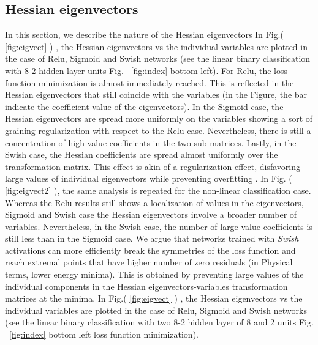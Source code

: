 \documentclass{article}
\begin{document}
\subsection{Hessian eigenvectors} \label{a:eigenvect}
%
In this section, we describe the nature of the Hessian eigenvectors
In Fig.( \ref{fig:eigvect} ) , the Hessian eigenvectors vs the individual variables are plotted in the case of Relu, Sigmoid and Swish networks (see the linear binary classification with 8-2 hidden layer units Fig. ~\eqref{fig:index} bottom left). For Relu, the loss function minimization is almost immediately reached. This is reflected in the Hessian eigenvectors that still coincide with the variables (in the Figure, the bar indicate the coefficient value of the eigenvectors). In the Sigmoid case, the Hessian eigenvectors are spread more uniformly on the variables showing a sort of graining regularization with respect to the Relu case. Nevertheless, there is still a concentration of high value coefficients in the two sub-matrices. Lastly, in the Swish case, the Hessian coefficients are spread almost uniformly over the transformation matrix. This effect is akin of a regularization effect, disfavoring large values of individual eigenvectors while preventing overfitting .
In Fig. ( \ref{fig:eigvect2} ), the same analysis is repeated for the non-linear classification case. Whereas the Relu results still shows a localization of values in the eigenvectors, Sigmoid and Swish case the Hessian eigenvectors involve a broader number of variables. Nevertheless, in the Swish case, the number of large value coefficients is still less than in the Sigmoid case.
We argue that networks trained with {\it Swish} activations can more efficiently break the symmetries of the loss function and reach extremal points that have higher number of zero residuals (in Physical terms, lower energy minima).
This is obtained by preventing large values of the individual components in the Hessian eigenvectors-variables transformation matrices at the minima. In Fig.( \ref{fig:eigvect} ) , the Hessian eigenvectors vs the individual variables are plotted in the case of Relu, Sigmoid and Swish networks (see the linear binary classification with two 8-2 hidden layer of 8 and 2 units Fig. ~\eqref{fig:index} bottom left loss function minimization).
%
\end{document}
